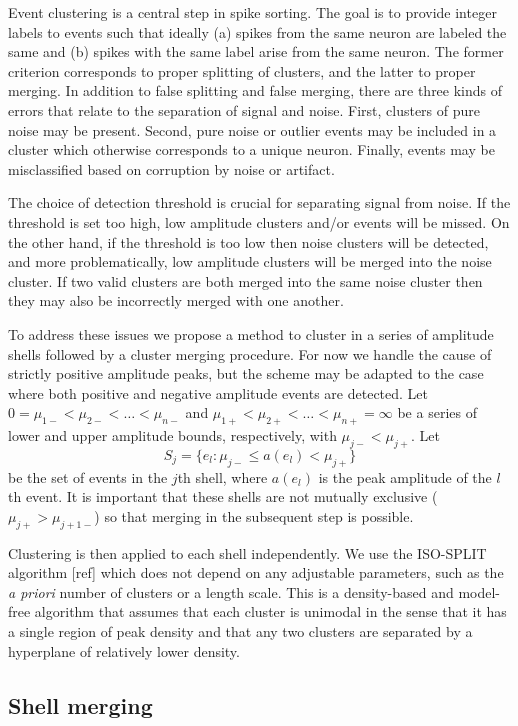 \documentclass{article}
\begin{document}
Event clustering is a central step in spike sorting. The goal is to provide integer labels to events such that ideally (a) spikes from the same neuron are labeled the same and (b) spikes with the same label arise from the same neuron. The former criterion corresponds to proper splitting of clusters, and the latter to proper merging. In addition to false splitting and false merging, there are three kinds of errors that relate to the separation of signal and noise. First, clusters of pure noise may be present. Second, pure noise or outlier events may be included in a cluster which otherwise corresponds to a unique neuron. Finally, events may be misclassified based on corruption by noise or artifact.

The choice of detection threshold is crucial for separating signal from noise. If the threshold is set too high, low amplitude clusters and/or events will be missed. On the other hand, if the threshold is too low then noise clusters will be detected, and more problematically, low amplitude clusters will be merged into the noise cluster. If two valid clusters are both merged into the same noise cluster then they may also be incorrectly merged with one another.

To address these issues we propose a method to cluster in a series of amplitude shells followed by a cluster merging procedure. For now we handle the cause of strictly positive amplitude peaks, but the scheme may be adapted to the case where both positive and negative amplitude events are detected. Let $0=\mu_{1-}<\mu_{2-}<\dots<\mu_{n-}$ and $\mu_{1+}<\mu_{2+}<\dots<\mu_{n+}=\infty$ be a series of lower and upper amplitude bounds, respectively, with $\mu_{j-}<\mu_{j+}$. Let
$$S_j=\{e_l:\mu_{j-}\leq a(e_l)<\mu_{j+}\}$$
be the set of events in the $j$th shell, where $a(e_l)$ is the peak amplitude of the $l$th event. It is important that these shells are not mutually exclusive ($\mu_{j+}>\mu_{j+1-}$) so that merging in the subsequent step is possible.

Clustering is then applied to each shell independently. We use the ISO-SPLIT algorithm [ref] which does not depend on any adjustable parameters, such as the \emph{a priori} number of clusters or a length scale. This is a density-based and model-free algorithm that assumes that each cluster is unimodal in the sense that it has a single region of peak density and that any two clusters are separated by a hyperplane of relatively lower density.

\subsection{Shell merging}
\end{document}
